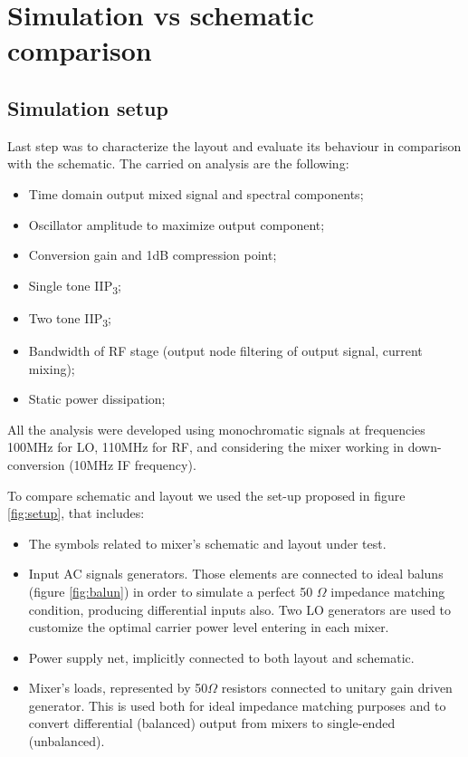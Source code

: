 \newpage
\thispagestyle{empty}
\clearpage\mbox{}\clearpage
\section{Simulation vs schematic comparison}

\subsection{Simulation setup}
Last step was to characterize the layout and evaluate its behaviour in comparison with the schematic. The carried on analysis are the following:
\begin{itemize}
	\item Time domain output mixed signal and spectral components;
	\item Oscillator amplitude to maximize output component;
	\item Conversion gain and 1dB compression point;
	\item Single tone IIP\textsubscript{3};
	\item Two tone IIP\textsubscript{3};
	\item Bandwidth of RF stage (output node filtering of output signal, current mixing);
	\item Static power dissipation;
\end{itemize}
All the analysis were developed using monochromatic signals at frequencies 100MHz for LO, 110MHz for RF, and considering the mixer working in down-conversion (10MHz IF frequency).

To compare schematic and layout we used the set-up proposed in figure \ref{fig:setup}, that includes:
\begin{itemize}
	\item The symbols related to mixer's schematic and layout under test.
	\item Input AC signals generators. Those elements are connected to ideal baluns (figure \ref{fig:balun}) in order to simulate a perfect 50 \(\Omega\) impedance matching condition, producing differential inputs also. Two LO generators are used to customize the optimal carrier power level entering in each mixer.
	\item Power supply net, implicitly connected to both layout and schematic.
	\item Mixer's loads, represented by 50\(\Omega\) resistors connected to unitary gain driven generator. This is used both for ideal impedance matching purposes and to convert differential (balanced) output from mixers to single-ended (unbalanced).
\end{itemize}

